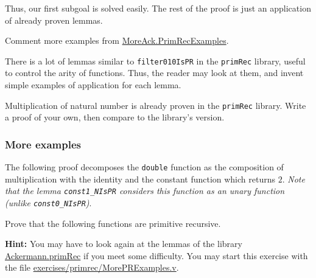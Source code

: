 \vspace{4pt}

\vspace{4pt}


Thus, our first subgoal is solved easily. The rest of the proof 
is just an application of already proven lemmas.

\vspace{4pt}




\begin{todo}
Comment more examples from   \href{../theories/html/hydras.MoreAck.PrimRecExamples.html}{MoreAck.PrimRecExamples}.
\end{todo}

\begin{exercise}
There is a lot of lemmas similar to \texttt{filter010IsPR} in the \texttt{primRec} library, useful to control the arity of functions.
Thus, the reader may look at them, and invent simple examples of application for each lemma.
\end{exercise}

\begin{exercise}
Multiplication of natural number is already proven in the \texttt{primRec} library. Write a proof of your own, then compare to the library's version.
\end{exercise}

%

\subsubsection{More examples}

The following proof decomposes the \texttt{double} function as the composition of 
multiplication with the identity and the constant function which returns $2$.
\emph{Note that the lemma \texttt{const1\_NIsPR} considers this function as an unary function (unlike \texttt{const0\_NIsPR})}. 




\begin{exercise}
Prove that the following functions are primitive recursive. 








\textbf{Hint:} You may have to look again at the lemmas of the library
\href{../theories/html/hydras.Ackermann.primRec.html}{Ackermann.primRec} if you meet some difficulty.
You may start this exercise with the file
    \href{https://https://github.com/coq-community/hydra-battles/blob/master/exercises/primrec/MorePRExamples.v}{exercises/primrec/MorePRExamples.v}.
\end{exercise}



